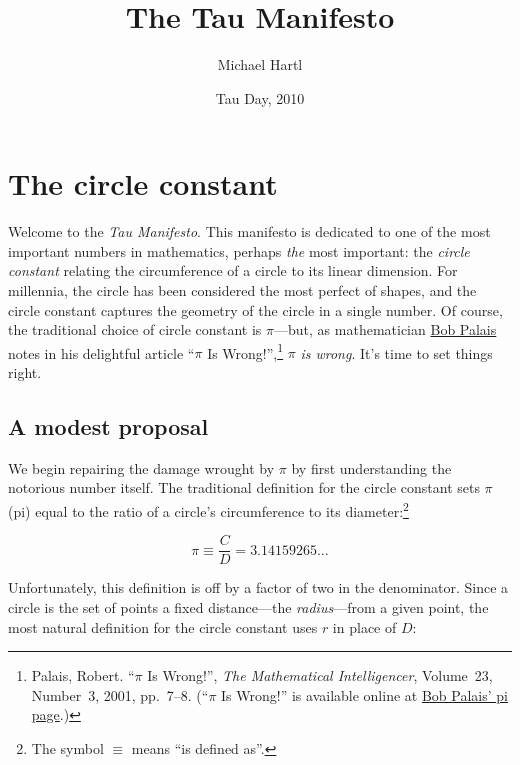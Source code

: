 \documentclass{article}
\begin{document}
\title{The Tau Manifesto}
\author{Michael Hartl}
\date{Tau Day, 2010}
\maketitle

\section{The circle constant} %
\label{sec:the_circle_constant}

Welcome to the \emph{Tau Manifesto}. This manifesto is dedicated to one of the most important numbers in mathematics, perhaps \emph{the} most important: the \emph{circle constant} relating the circumference of a circle to its linear dimension. For millennia, the circle has been considered the most perfect of shapes, and the circle constant captures the geometry of the circle in a single number. Of course, the traditional choice of circle constant is $\pi$---but, as mathematician \href{http://www.math.utah.edu/~palais/}{Bob Palais} notes in his delightful article ``$\pi$ Is Wrong!'',\footnote{Palais, Robert. ``$\pi$ Is Wrong!'', \emph{The Mathematical Intelligencer}, Volume~23, Number~3, 2001, pp.~7--8. (``$\pi$ Is Wrong!'' is available online at \href{http://www.math.utah.edu/~palais/pi.html}{Bob Palais' pi page}.)} $\pi$ \emph{is wrong}. It's time to set things right.


  \subsection{A modest proposal} %
  \label{sec:a_modest_proposal}

We begin repairing the damage wrought by $\pi$ by first understanding the notorious number itself. The traditional definition for the circle constant sets $\pi$ (pi) equal to the ratio of a circle's circumference to its diameter:\footnote{The symbol $\equiv$ means ``is defined as''.}


\[
  \pi \equiv \frac{C}{D} = 3.14159265\ldots
\]

\noindent Unfortunately, this definition is off by a factor of two in the denominator. Since a circle is the set of points a fixed distance---the \emph{radius}---from a given point, the most natural definition for the circle constant uses $r$ in place of $D$:
\end{document}
